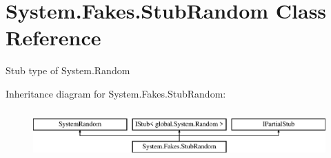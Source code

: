\hypertarget{class_system_1_1_fakes_1_1_stub_random}{\section{System.\-Fakes.\-Stub\-Random Class Reference}
\label{class_system_1_1_fakes_1_1_stub_random}
}


Stub type of System.\-Random 


Inheritance diagram for System.\-Fakes.\-Stub\-Random\-:\begin{figure}[H]
\begin{center}
\leavevmode
\includegraphics[height=1.876047cm]{class_system_1_1_fakes_1_1_stub_random}
\end{center}
\end{figure}
